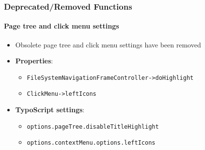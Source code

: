 
\begin{frame}[fragile]
	\frametitle{Deprecated/Removed Functions}
	\framesubtitle{Page tree and click menu settings}

	\begin{itemize}

		\item Obsolete page tree and click menu settings have been removed
		\item \textbf{Properties}:

		\begin{itemize}
			\item \texttt{FileSystemNavigationFrameController->doHighlight}
			\item \texttt{ClickMenu->leftIcons}
		\end{itemize}

		\item \textbf{TypoScript settings}:

		\begin{itemize}
			\item \texttt{options.pageTree.disableTitleHighlight}
			\item \texttt{options.contextMenu.options.leftIcons}
		\end{itemize}

	\end{itemize}

\end{frame}


